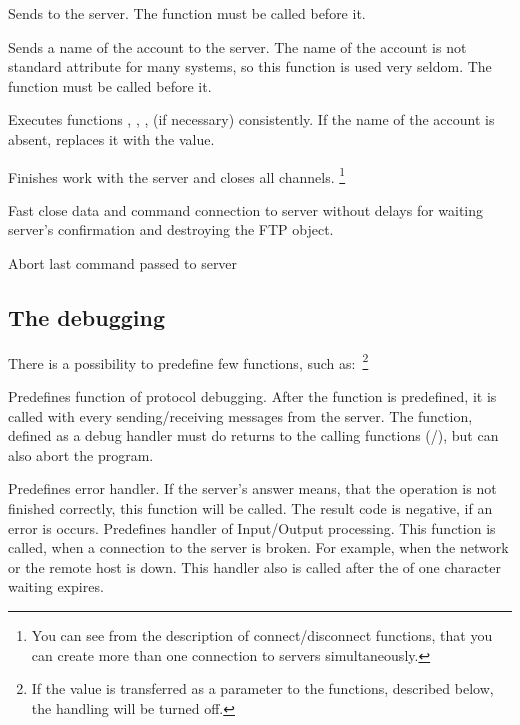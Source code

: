 {
 Sends  to the server. The function  must be called before it.
}

{
 Sends a name of the account to the server. The name of the account is not standard
 attribute for many systems, so this function is used very seldom.
 The function  must be called before it.
}

{
  Executes functions , , ,
   (if necessary)  consistently. If the name of the account is absent, 
  replaces it with the  value.
}

{ Finishes work with the server and closes all channels. 
\footnote{You can see from the description of connect/disconnect functions, that you can create 
more than one connection to servers simultaneously.}
}

{ Fast close data and command connection to server without delays for waiting
server's confirmation and destroying the FTP object.
}

{ Abort last command passed to server}


\subsection{The debugging} \label{debug} 

There is a possibility to predefine few functions, 
such as:~\footnote{If the  value is transferred as a parameter  to the functions, described below,
the handling will be turned off.}

{  Predefines function of protocol debugging.
   After the function is predefined, it is called with every 
   sending/receiving messages from the server.
   The function, defined as a debug handler must do returns to the calling 
functions (/), but can also abort the program. 

}

{
   Predefines error handler. If the server's answer means, that the operation is not finished 
 correctly, this function will be called.
   The result code is negative, if an error is occurs.
}
{
   Predefines handler of Input/Output processing. This function is called, when a connection to the  
   server is broken. For example, when the network or the remote host is down. This handler also is
   called after the   of one character waiting expires.   
}

